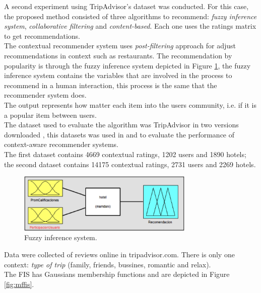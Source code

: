 A second experiment using TripAdvisor's dataset was conducted.  For
this case, the proposed method consisted of three algorithms  to
recommend:  \textit{fuzzy inference system}, \textit{collaborative
filtering} and \textit{content-based}. Each one uses the ratings
matrix to get recommendations.\\     The contextual recommender system
uses  \textit{post-filtering} approach  \cite{adomavicius2011context}
for adjust recommendations in context such as restaurants. 
The recommendation by popularity is  through the fuzzy inference system
depicted in Figure  \ref{fig:fis},  the fuzzy inference system
contains the variables that are involved in the process to recommend
in a human interaction, this process is the same that the recommender
system does. \\The output represents how matter each item into the
users community, i.e. if it is a popular item between users. \\ The
dataset used to evaluate the algorithm was TripAdvisor in two versions
downloaded  \cite{linkzeng}, this datasets was used in
\cite{zheng2014context} and  \cite{zheng2012differential} to  evaluate
the performance of context-aware recommender systems. \\The first
dataset contains 4669 contextual ratings, 1202 users and 1890 hotels;
the second dataset contains 14175 contextual ratings, 2731 users and
2269 hotels. 
\begin{figure}
\captionsetup{justification=centering,margin=2cm,font=footnotesize}
\centering
\setlength\fboxsep{0pt}
\setlength\fboxrule{0.7pt}
\includegraphics[width=0.75\textwidth]{img/fis.png}
\caption{Fuzzy inference system.}
\label{fig:fis}   
\end{figure}
Data were collected of reviews online in tripadvisor.com.
There is only one context: \textit{type of trip} (family, friends,
bussines, romantic and relax).\\  The FIS has Gaussians membership
functions and are depicted in  Figure  \ref{fig:mffis}.
